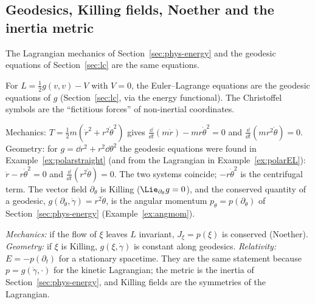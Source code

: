 \subsection{Geodesics, Killing fields, Noether and the inertia metric}\label{sec:noethersynth}

The Lagrangian mechanics of Section~\ref{sec:phys-energy} and the geodesic equations of Section~\ref{sec:lc} are the same equations.

\begin{synthesis}[free motion $=$ geodesic of the inertia metric]
For $L=\frac12g(v,v)-V$ with $V=0$, the Euler--Lagrange equations are the geodesic equations of $g$ (Section~\ref{sec:lc}, via the energy functional). The Christoffel symbols are the ``fictitious forces'' of non-inertial coordinates.
\end{synthesis}

\begin{example}\label{ex:polarfree}
Mechanics: $T=\frac12m(\dot r^2+r^2\dot\theta^2)$ gives $\frac{\dd}{\dd t}(m\dot r)-mr\dot\theta^2=0$ and $\frac{\dd}{\dd t}(mr^2\dot\theta)=0$.
Geometry: for $g=\dd r^2+r^2\dd\theta^2$ the geodesic equations were found in Example~\ref{ex:polarstraight} (and from the Lagrangian in Example~\ref{ex:polarEL}): $\ddot r-r\dot\theta^2=0$ and $\frac{\dd}{\dd t}(r^2\dot\theta)=0$.
The two systems coincide; $-r\dot\theta^2$ is the centrifugal term. The vector field $\partial_\theta$ is Killing ($\Lie_{\partial_\theta}g=0$), and the conserved quantity of a geodesic, $g(\partial_\theta,\dot\gamma)=r^2\dot\theta$, is the angular momentum $p_\theta=p(\partial_\theta)$ of Section~\ref{sec:phys-energy} (Example~\ref{ex:angmom}).
\end{example}

\begin{keyidea}
\emph{Mechanics:} if the flow of $\xi$ leaves $L$ invariant, $J_\xi=p(\xi)$ is conserved (Noether). \emph{Geometry:} if $\xi$ is Killing, $g(\xi,\dot\gamma)$ is constant along geodesics. \emph{Relativity:} $E=-p(\partial_t)$ for a stationary spacetime.
They are the same statement because $p=g(\dot\gamma,\cdot)$ for the kinetic Lagrangian; the metric is the inertia of Section~\ref{sec:phys-energy}, and Killing fields are the symmetries of the Lagrangian.
\end{keyidea}
